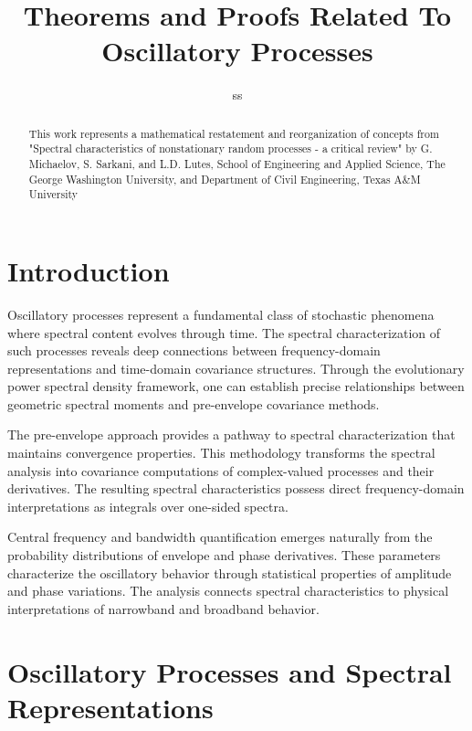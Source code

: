 \documentclass{article}
\newcommand{\tmaffiliation}[1]{\\ #1}
\begin{document}
\title{Theorems and Proofs Related To Oscillatory Processes}

\author{
  ss
  \tmaffiliation{}
}

\maketitle

\begin{abstract}
  This work represents a mathematical restatement and reorganization of
  concepts from "Spectral characteristics of nonstationary random processes -
  a critical
  review"{\cite{spectralCharacteristicsOfNonstationaryRandomProcesses}} by G.
  Michaelov, S. Sarkani, and L.D. Lutes, School of Engineering and Applied
  Science, The George Washington University, and Department of Civil
  Engineering, Texas A\&M University
\end{abstract}

{\tableofcontents}

\section{Introduction}

Oscillatory processes represent a fundamental class of stochastic phenomena
where spectral content evolves through time. The spectral characterization of
such processes reveals deep connections between frequency-domain
representations and time-domain covariance structures. Through the
evolutionary power spectral density framework, one can establish precise
relationships between geometric spectral moments and pre-envelope covariance
methods.

The pre-envelope approach provides a pathway to spectral characterization that
maintains convergence properties. This methodology transforms the spectral
analysis into covariance computations of complex-valued processes and their
derivatives. The resulting spectral characteristics possess direct
frequency-domain interpretations as integrals over one-sided spectra.

Central frequency and bandwidth quantification emerges naturally from the
probability distributions of envelope and phase derivatives. These parameters
characterize the oscillatory behavior through statistical properties of
amplitude and phase variations. The analysis connects spectral characteristics
to physical interpretations of narrowband and broadband behavior.

\section{Oscillatory Processes and Spectral Representations}
\end{document}

